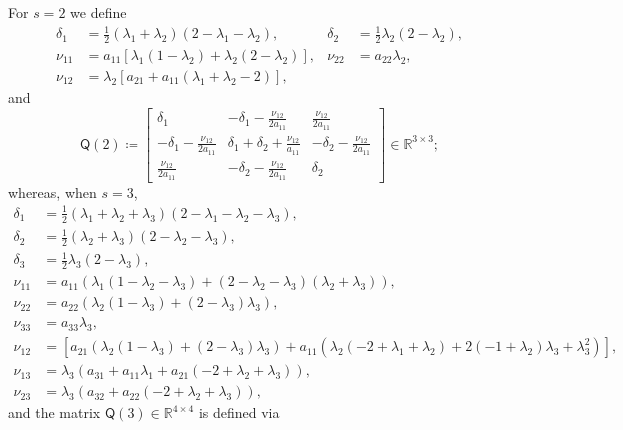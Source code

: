 \documentclass{amsart}
\newcommand{\Real}{\mathbb{R}}
\newcommand{\msfQ}{\mathsf{Q}}
\theoremstyle{definition}
\newcommand{\AJS}[1]{#1}
\begin{document}
For $s=2$ we define
\begin{align*}
  \delta_1 &= \frac12(\lambda_1 + \lambda_2)(2 -\lambda_1 - \lambda_2) , &
  \delta_2 &= \frac12 \lambda_2(2 - \lambda_2) ,
  \\
  \nu_{11} &= a_{11} \left[ \lambda_1(1-\lambda_2) + \lambda_2(2-\lambda_2) \right] , &
  \nu_{22} &= a_{22} \lambda_2,
  \\
  \nu_{12} &= \lambda_2 \left[ a_{21} + a_{11}(\lambda_1 + \lambda_2-2) \right] ,
\end{align*}
and
\[
  \msfQ(2) \coloneqq
  \begin{bmatrix}
    \delta_1 & -\delta_1 - \frac{\nu_{12}}{2a_{11}} & \frac{\nu_{12}}{2a_{11}} \\
    -\delta_1 - \frac{\nu_{12}}{2a_{11}} & \delta_1 + \delta_2 + \frac{\nu_{12}}{a_{11}} & - \delta_2 - \frac{\nu_{12}}{2a_{11}} \\
    \frac{\nu_{12}}{2a_{11}} & - \delta_2 - \frac{\nu_{12}}{2a_{11}} & \delta_2
  \end{bmatrix} \in \Real^{3 \times 3} ;
\]
whereas, when $s=3$,
\begin{align*}
    \delta_1 &= \frac12(\lambda_1 + \lambda_2 + \lambda_3)(2-\lambda_1 - \lambda_2 - \lambda_3) , \\
    \delta_2 &= \frac12(\lambda_2 + \lambda_3)(2-\lambda_2 - \lambda_3),
    \\
    \delta_3 &= \frac12\lambda_3 (2-\lambda_3), \\
    \nu_{11} &=  a_{11} (\lambda_1 (1 - \lambda_2 - \lambda_3) + (2 - \lambda_2 - \lambda_3) (\lambda_2 + \lambda_3)),
    \\
    \nu_{22} &=  a_{22} (\lambda_2 (1 - \lambda_3) + (2 - \lambda_3) \lambda_3), \\
    \nu_{33} &= a_{33}\lambda_3,
    \\
    \nu_{12} &=  [a_{21} (\lambda_2 (1- \lambda_3) + (2 - \lambda_3) \lambda_3)+ a_{11} (\lambda_2 (-2 + \lambda_1 + \lambda_2) + 2 (-1 + \lambda_2) \lambda_3 + \lambda_3^2)], \\
    \nu_{13} &=  \lambda_3 (a_{31} + a_{11} \lambda_1 + a_{21} (-2 + \lambda_2 + \lambda_3)),
    \\
    \nu_{23} &=  \lambda_3 (a_{32} + a_{22} (-2 + \lambda_2 + \lambda_3)),
\end{align*}
and the matrix $\msfQ(3) \in \Real^{4 \times 4}$ \AJS{is defined} via
\end{document}
